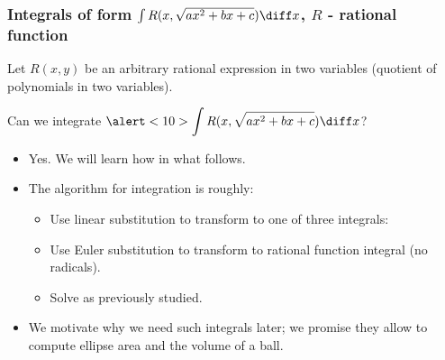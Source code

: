 \begin{frame}
\frametitle{Integrals of form $\int R(x,\sqrt{ax^2+bx+c}) \diff x$, $R$ - rational function}
Let $R(x,y)$ be an arbitrary rational expression in two variables (quotient of polynomials in two variables).
\begin{question}
Can we integrate $\alert<10>{\displaystyle\int R(x,\sqrt{ax^2+bx+c})\diff x}$?
\end{question}
\begin{itemize}
\item<2-> Yes. We will learn how in what follows.
\item<3-> The algorithm for integration is roughly:
\begin{itemize}
\item<4-> Use linear substitution to transform to one of three integrals: 
  
\item<8-> Use Euler substitution to transform to rational function integral (no radicals).
\item<9-> Solve as previously studied.
\end{itemize}
\item<10,11-> We motivate why we need \alert<10>{such integrals later}; we promise they allow to compute ellipse area and the volume of a ball.
\end{itemize}
\end{frame}
